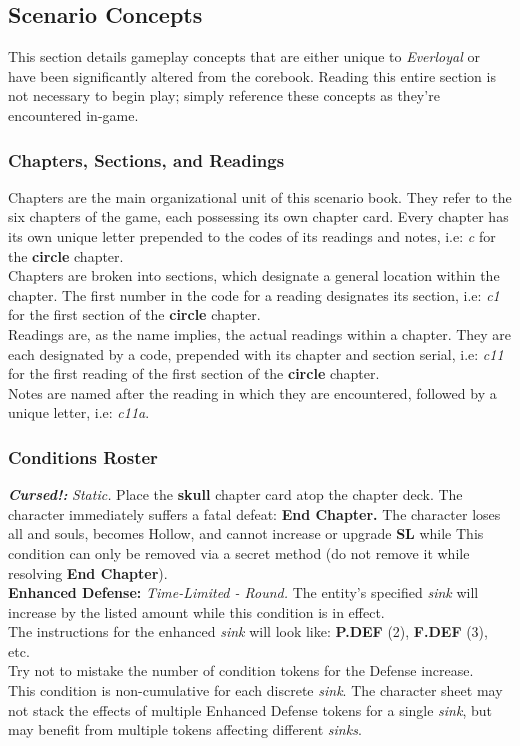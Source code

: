 \documentclass[12pt]{article}
\begin{document}
\begin{multicols*}{2}
\subsection{Scenario Concepts}
This section details gameplay concepts that are either unique to \emph{Everloyal} or have been significantly altered from the corebook. Reading this entire section is not necessary to begin play; simply reference these concepts as they’re encountered in-game.

\subsubsection{Chapters, Sections, and Readings}
Chapters are the main organizational unit of this scenario book. They refer to the six chapters of the game, each possessing its own chapter card. Every chapter has its own unique letter prepended to the codes of its readings and notes, i.e: \emph{c} for the \textbf{circle} chapter.\\
Chapters are broken into sections, which designate a general location within the chapter. The first number in the code for a reading designates its section, i.e: \emph{c1} for the first section of the \textbf{circle} chapter.\\
Readings are, as the name implies, the actual readings within a chapter. They are each designated by a code, prepended with its chapter and section serial, i.e: \emph{c11} for the first reading of the first section of the \textbf{circle} chapter.\\
Notes are named after the reading in which they are encountered, followed by a unique letter, i.e: \emph{c11a}.

\subsubsection{Conditions Roster}
\textbf{\emph{Cursed!:}} \hypertarget{Cursed!}{}\emph{Static.} Place the \textbf{skull} chapter card atop the chapter deck. The character immediately suffers a fatal defeat: \textbf{End Chapter.} The character loses all  and souls, becomes Hollow, and cannot increase  or upgrade \textbf{SL} while  This condition can only be removed via a secret method (do not remove it while resolving \textbf{End Chapter}).\\

\textbf{Enhanced Defense:} \emph{Time-Limited - Round.} The entity’s specified \emph{sink} will increase by the listed amount while this condition is in effect.\\
The instructions for the enhanced \emph{sink} will look like: \textbf{P.DEF} (2), \textbf{F.DEF} (3), etc.\\
Try not to mistake the number of condition tokens for the Defense increase.\\
This condition is non-cumulative for each discrete \emph{sink}. The character sheet may not stack the effects of multiple Enhanced Defense tokens for a single \emph{sink}, but may benefit from multiple tokens affecting different \emph{sinks}.


\end{multicols*}
\end{document}
